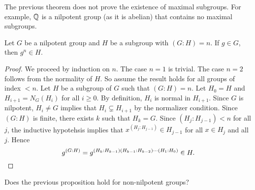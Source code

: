 The previous theorem does not prove the existence of maximal subgroups. For example, 
$\mathbb{Q}$ is a nilpotent group (as it is abelian) 
that contains no maximal subgroups. 

\begin{proposition}
\label{pro:g^n}
Let $G$ be a nilpotent group and $H$ be a subgroup with $(G:H)=n$. If 
$g\in G$, then $g^n\in H$.
\end{proposition}

\begin{proof}
We proceed by induction on $n$. The case $n=1$ is trivial. The case  
$n=2$ follows from the normality of  $H$. So assume the result 
holds for all groups of index $<n$. Let $H$ be a subgroup of $G$ such that $(G:H)=n$. 
Let $H_0=H$ and $H_{i+1}=N_G(H_i)$ for all $i\geq0$. By definition, $H_{i}$ is normal in 
$H_{i+1}$. Since $G$ is nilpotent, $H_i\ne G$
implies that $H_i\subsetneq H_{i+1}$ by the normalizer condition. 
Since $(G:H)$ is finite, there exists $k$ such that  $H_k=G$. Since
$(H_j:H_{j-1})<n$ for all $j$, the inductive hypotehsis implies that 
	$x^{(H_j:H_{j-1})}\in H_{j-1}$ for all $x\in H_j$ and all $j$. Hence 
	\[
		g^{(G:H)}=g^{(H_k:H_{k-1})(H_{k-1}:H_{k-2})\cdots (H_1:H_0)}\in H.\qedhere 
	\]
\end{proof}

\begin{exercise}
\label{xca:g^n}
    Does the previous proposition hold for non-nilpotent groups? 
\end{exercise}



